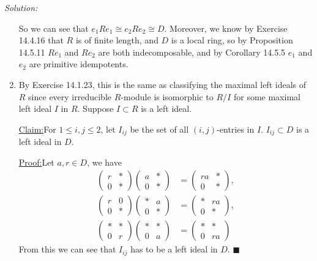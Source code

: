 \documentclass[a4paper, 12pt]{article}
\newenvironment{solution}
    {\textit{Solution:}}
    {}
\newenvironment{claim}[1]{\par\noindent\underline{Claim:}\space#1}{}
\newenvironment{claimproof}[1]{\par\noindent\underline{Proof:}\space#1}{\hfill $\blacksquare$}
\begin{document}
\begin{solution}
\begin{enumerate}[(1)]
So we can see that \(e_1Re_1\cong e_2Re_2\cong D\). Moreover, we know by Exercise 14.4.16 that \(R\) is of finite length, and \(D\) is a local ring, so by Proposition 14.5.11 \(Re_1\) 
and \(Re_2\) are both indecomposable, and by Corollary 14.5.5 \(e_1\) and \(e_2\) are primitive idempotents.
\item By Exercise 14.1.23, this is the same as classifying the maximal left ideals of \(R\) since every irreducible \(R\)-module is isomorphic to \(R/I\) for some maximal left ideal \(I\) in \(R\). Suppose \(I\subset R\) is a left ideal. 
\begin{claim}
For \(1\leq i,j\leq 2\), let \(I_{ij}\) be the set of all \((i,j)\)-entries in \(I\). \(I_{ij}\subset D\) is a left ideal in \(D\).
\end{claim}
\begin{claimproof}
Let \(a,r\in D\), we have 
\begin{align*}
\begin{pmatrix}
    r&*\\ 
    0&*
\end{pmatrix}\begin{pmatrix}
    a&*\\ 
    0&*
\end{pmatrix}&=\begin{pmatrix}
    ra&*\\ 
    0&*
\end{pmatrix},\\[5pt]
\begin{pmatrix}
    r&0\\ 
    0&*
\end{pmatrix}\begin{pmatrix}
    *&a\\ 
    0&*
\end{pmatrix}&=\begin{pmatrix}
    *&ra\\ 
    0&*
\end{pmatrix},\\[5pt]
\begin{pmatrix}
    *&*\\ 
    0&r
\end{pmatrix}\begin{pmatrix}
    *&*\\ 
    0&a
\end{pmatrix}&=\begin{pmatrix}
    *&*\\ 
    0&ra
\end{pmatrix}
\end{align*}
From this we can see that \(I_{ij}\) has to be a left ideal in \(D\).
\end{claimproof}


\end{enumerate}
\end{solution}
\end{document}
